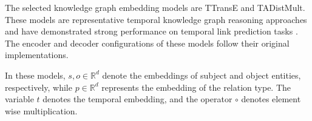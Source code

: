 \documentclass[11pt]{article}
\begin{document}
The selected knowledge graph embedding models are TTransE and TADistMult. These models are representative temporal knowledge graph reasoning approaches and have demonstrated strong performance on temporal link prediction tasks \citep{leblay2018deriving, garcia2020temporal}. The encoder and decoder configurations of these models follow their original implementations.

In these models, $s, o \in \mathbb{R}^d$ denote the embeddings of subject and object entities, respectively, while $p \in \mathbb{R}^d$ represents the embedding of the relation type. The variable $t$ denotes the temporal embedding, and the operator $\circ$ denotes element wise multiplication.



\begin{table}[t]
\centering
\caption{Distillation results of different model method combinations on two datasets}
\label{tab:distillation_results}
\setlength{\tabcolsep}{4pt}
\end{table}
\end{document}
